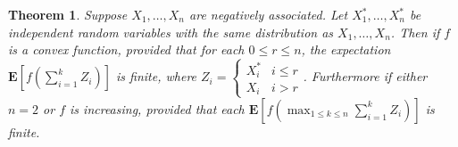\documentclass{article}
\newtheorem{theorem}{Theorem}
\newcommand*{\E}[0]{\mathbf{E}}
\def\[#1\]{\begin{align*}#1\end{align*}}
\begin{document}
\begin{theorem}
  Suppose $X_1, \dots, X_n$ are negatively associated.
  Let $X_1^*, \dots, X_n^*$ be independent random variables with the same distribution as $X_1, \dots, X_n$.
  Then if $f$ is a convex function,
  \[\E{} \le \E{}\]
  provided that for each $0 \le r \le n$, the expectation $\E\left[f\left(\sum_{i=1}^k Z_i\right)\right]$ is finite, where $Z_i = 
  \begin{cases}
    X_i^* & i \le r \\
    X_i & i > r
  \end{cases}$.
  Furthermore if either $n = 2$ or $f$ is increasing,
  \[\E\left[f\left(\max_{1 \le k \le n} \sum_{i=1}^k X_i\right)\right] \le \E\left[f\left(\max_{1 \le k \le n} \sum_{i=1}^k X_i^*\right)\right]\]
  provided that each $\E\left[f\left(\max_{1 \le k \le n} \sum_{i=1}^k Z_i\right)\right]$ is finite.
\end{theorem}
\end{document}

